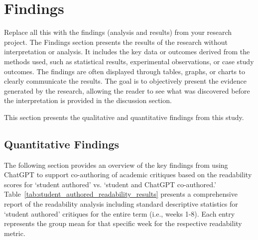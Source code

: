 \section{Findings}
\label{Findings}

Replace all this with the findings (analysis and results) from your research project.  The Findings section presents the results of the research without interpretation or analysis. It includes the key data or outcomes derived from the methods used, such as statistical results, experimental observations, or case study outcomes. The findings are often displayed through tables, graphs, or charts to clearly communicate the results. The goal is to objectively present the evidence generated by the research, allowing the reader to see what was discovered before the interpretation is provided in the discussion section. 

This section presents the qualitative and quantitative findings from this study.

\subsection{Quantitative Findings}
The following section provides an overview of the key findings from using ChatGPT to support co-authoring of academic critiques based on the readability scores for `student authored' vs. `student and ChatGPT co-authored.'  Table~\ref{tab:student_authored_readability_results} presents a comprehensive report of the readability analysis including standard descriptive statistics for `student authored' critiques for the entire term (i.e., weeks 1-8). Each entry represents the group mean for that specific week for the respective readability metric.

